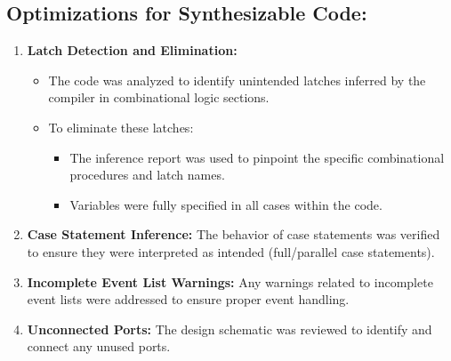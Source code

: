 \documentclass{article}
\begin{document}
\subsection{Optimizations for Synthesizable Code:}

\begin{enumerate}
    \item \textbf{Latch Detection and Elimination:}

\begin{itemize}
        \item The code was analyzed to identify unintended latches inferred by the compiler in combinational logic sections.
        \item To eliminate these latches:

    \begin{itemize}
            \item The inference report was used to pinpoint the specific combinational procedures and latch names.
            \item Variables were fully specified in all cases within the code.
    \end{itemize}

\end{itemize}

    \item \textbf{Case Statement Inference:}
The behavior of case statements was verified to ensure they were interpreted as intended (full/parallel case statements).

    \item \textbf{Incomplete Event List Warnings:}
Any warnings related to incomplete event lists were addressed to ensure proper event handling.

    \item \textbf{Unconnected Ports:}
The design schematic was reviewed to identify and connect any unused ports.

\end{enumerate}

 \newpage
\end{document}
